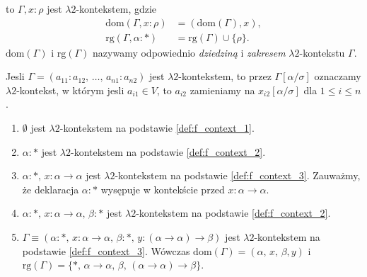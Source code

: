 \begin{definicja}
\begin{enumerate}[label=(E\arabic*), ref=(E\arabic*)]
\begin{enumerate}
    \end{enumerate}
      to \(\Gamma, x:\rho\) jest \(\lambda 2\)-kontekstem, gdzie 
      \begin{align*} 
        \mathrm{dom}(\Gamma, x:\rho)&=(\mathrm{dom}(\Gamma), x),\\
      \mathrm{rg}(\Gamma, \alpha:*)&=\mathrm{rg}(\Gamma)\cup\{\rho\}.
      \end{align*}
      \(\mathrm{dom}(\Gamma)\) i \(\mathrm{rg}(\Gamma)\) nazywamy odpowiednio \emph{dziedziną} i \emph{zakresem} \(\lambda 2\)-kontekstu \(\Gamma\).
  \end{enumerate}
    Jesli \(\Gamma=(a_{11}: a_{12},\,\dots,\,a_{n1}:a_{n2})\) jest \(\lambda 2\)-kontekstem, to przez \(\Gamma[\alpha/\sigma]\) oznaczamy \(\lambda 2\)-kontekst, w którym jesli \(a_{i1}\in V\), to \(a_{i2}\) zamieniamy na \(x_{i2}[\alpha/\sigma]\)  dla \(1\leq i \leq n\).
\end{definicja}

\begin{przyklad}
  \begin{enumerate}[label=(\alph*), ref=(\alph*)]
    \setlength\itemsep{0em}
    \item \(\emptyset\) jest  \(\lambda 2\)-kontekstem na podstawie
      \ref{def:f_context_1}.\label{ex:f_context_a}
    \item \(\alpha:*\)  jest \(\lambda 2\)-kontekstem  na podstawie
\ref{def:f_context_2}.\label{ex:f_context_b}

    \item           \(\alpha:*,\,x:\alpha\to\alpha\)           jest
\(\lambda 2\)-kontekstem      na      podstawie      
\ref{def:f_context_3}.     Zauważmy,     że
deklaracja    \(\alpha:*\)    wysępuje   w    kontekście    przed
\(x:\alpha\to\alpha\).\label{ex:f_context_c}

    \item \(\alpha:*,\,x:\alpha\to\alpha,\,\beta:*\) jest \(\lambda 2\)-kontekstem na podstawie \ref{def:f_context_2}.\label{ex:f_context_d}

    \item \(\Gamma\equiv(\alpha:*,\,x:\alpha\to\alpha,\,\beta:*,\,y:(\alpha\to\alpha)\to\beta)\) jest \(\lambda 2\)-kontekstem na podstawie \ref{def:f_context_3}. Wówczas \(\mathrm{dom}(\Gamma)=(\alpha,\,x,\,\beta,y)\) i \(\mathrm{rg}(\Gamma)=\{*,\,\alpha\to\alpha,\, \beta,\,(\alpha\to\alpha)\to\beta\}\).\label{ex:f_context_e}
  \end{enumerate}
\end{przyklad}

